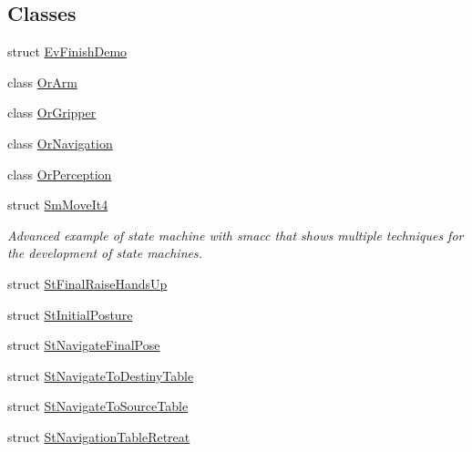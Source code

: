 \subsection*{Classes}
\begin{DoxyCompactItemize}
\item 
struct \hyperlink{structsm__moveit__4_1_1EvFinishDemo}{Ev\+Finish\+Demo}
\item 
class \hyperlink{classsm__moveit__4_1_1OrArm}{Or\+Arm}
\item 
class \hyperlink{classsm__moveit__4_1_1OrGripper}{Or\+Gripper}
\item 
class \hyperlink{classsm__moveit__4_1_1OrNavigation}{Or\+Navigation}
\item 
class \hyperlink{classsm__moveit__4_1_1OrPerception}{Or\+Perception}
\item 
struct \hyperlink{structsm__moveit__4_1_1SmMoveIt4}{Sm\+Move\+It4}
\begin{DoxyCompactList}\small\item\em Advanced example of state machine with smacc that shows multiple techniques for the development of state machines. \end{DoxyCompactList}\item 
struct \hyperlink{structsm__moveit__4_1_1StFinalRaiseHandsUp}{St\+Final\+Raise\+Hands\+Up}
\item 
struct \hyperlink{structsm__moveit__4_1_1StInitialPosture}{St\+Initial\+Posture}
\item 
struct \hyperlink{structsm__moveit__4_1_1StNavigateFinalPose}{St\+Navigate\+Final\+Pose}
\item 
struct \hyperlink{structsm__moveit__4_1_1StNavigateToDestinyTable}{St\+Navigate\+To\+Destiny\+Table}
\item 
struct \hyperlink{structsm__moveit__4_1_1StNavigateToSourceTable}{St\+Navigate\+To\+Source\+Table}
\item 
struct \hyperlink{structsm__moveit__4_1_1StNavigationTableRetreat}{St\+Navigation\+Table\+Retreat}
\end{DoxyCompactItemize}
